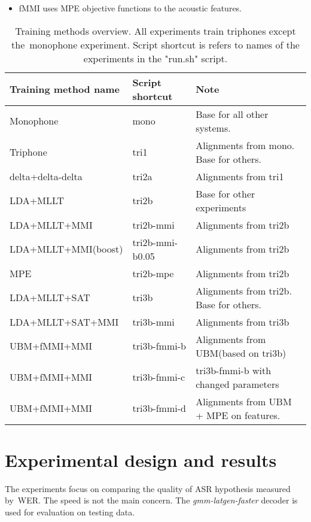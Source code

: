{\begin{itemize}
    \item \cite{povey2005fmpe} \ac{fMMI} uses \ac{MPE} objective functions to the acoustic features.
\end{itemize}
\begin{table}[!htp]\label{tab:disc_train}
\small{\begin{tabular}{lll}
\hline
Training method name & Script shortcut & Note\\
\hline
Monophone & mono & Base for all other systems.\\
Triphone  & tri1 &  Alignments from mono. Base for others.\\
delta+delta-delta & tri2a & Alignments from tri1 \\
\ac{LDA}+\ac{MLLT} & tri2b &  Base for other experiments \\
\ac{LDA}+\ac{MLLT}+\ac{MMI} & tri2b-mmi & Alignments from tri2b \\
\ac{LDA}+\ac{MLLT}+\ac{MMI}(boost) & tri2b-mmi-b0.05  & Alignments from tri2b \\
\ac{MPE} & tri2b-mpe & Alignments from tri2b \\
\ac{LDA}+\ac{MLLT}+\ac{SAT} & tri3b & Alignments from tri2b. Base for others. \\
\ac{LDA}+\ac{MLLT}+\ac{SAT}+\ac{MMI} & tri3b-mmi  & Alignments from tri3b \\
\ac{UBM}+\ac{fMMI}+\ac{MMI} & tri3b-fmmi-b & Alignments from \ac{UBM}(based on tri3b) \\
\ac{UBM}+\ac{fMMI}+\ac{MMI} & tri3b-fmmi-c & tri3b-fmmi-b with changed parameters \\
\ac{UBM}+\ac{fMMI}+\ac{MMI} & tri3b-fmmi-d & Alignments from \ac{UBM} + \ac{MPE} on features.\\ 
\end{tabular}}
\caption{Training methods overview. All experiments train triphones except the~monophone experiment. Script shortcut is refers to names of the experiments in the "run.sh" script.}
\end{table}


\section{Experimental design and results} 
\label{sec:exps}
The experiments focus on comparing the quality of ASR hypothesis measured by~\ac{WER}.
The speed is not the main concern.  The {\it gmm-latgen-faster}\/ decoder is used for evaluation on testing data. 

}
